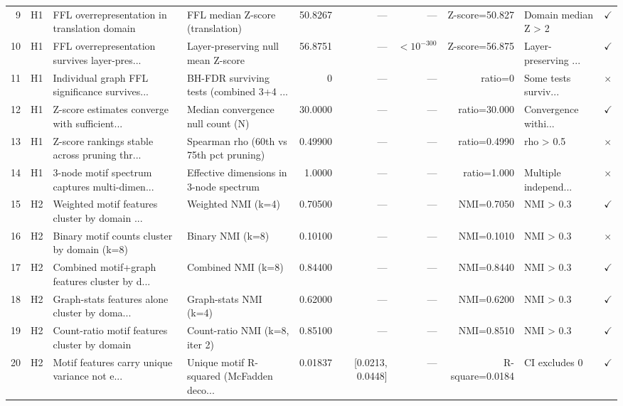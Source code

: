 \documentclass[11pt,a4paper]{article}
\begin{document}
\begin{landscape}
\begin{longtable}{rlp{3.2cm}p{3cm}rrrrp{1.5cm}l}
\rowcolor{rowgray}
9 & H1 & FFL overrepresentation in translation domain & FFL median Z-score (translation) & 50.8267 & --- & --- & Z-score=50.827 & Domain median Z \textgreater{} 2 & $\checkmark$ \\
10 & H1 & FFL overrepresentation survives layer-pres... & Layer-preserving null mean Z-score & 56.8751 & --- & $<10^{-300}$ & Z-score=56.875 & Layer-preserving ... & $\checkmark$ \\
\rowcolor{rowgray}
11 & H1 & Individual graph FFL significance survives... & BH-FDR surviving tests (combined 3+4 ... & 0 & --- & --- & ratio=0 & Some tests surviv... & $\times$ \\
12 & H1 & Z-score estimates converge with sufficient... & Median convergence null count (N) & 30.0000 & --- & --- & ratio=30.000 & Convergence withi... & $\checkmark$ \\
\rowcolor{rowgray}
13 & H1 & Z-score rankings stable across pruning thr... & Spearman rho (60th vs 75th pct pruning) & 0.49900 & --- & --- & ratio=0.4990 & rho \textgreater{} 0.5 & $\times$ \\
14 & H1 & 3-node motif spectrum captures multi-dimen... & Effective dimensions in 3-node spectrum & 1.0000 & --- & --- & ratio=1.000 & Multiple independ... & $\times$ \\
\midrule
\rowcolor{rowgray}
15 & H2 & Weighted motif features cluster by domain ... & Weighted NMI (k=4) & 0.70500 & --- & --- & NMI=0.7050 & NMI \textgreater{} 0.3 & $\checkmark$ \\
16 & H2 & Binary motif counts cluster by domain (k=8) & Binary NMI (k=8) & 0.10100 & --- & --- & NMI=0.1010 & NMI \textgreater{} 0.3 & $\times$ \\
\rowcolor{rowgray}
17 & H2 & Combined motif+graph features cluster by d... & Combined NMI (k=8) & 0.84400 & --- & --- & NMI=0.8440 & NMI \textgreater{} 0.3 & $\checkmark$ \\
18 & H2 & Graph-stats features alone cluster by doma... & Graph-stats NMI (k=4) & 0.62000 & --- & --- & NMI=0.6200 & NMI \textgreater{} 0.3 & $\checkmark$ \\
\rowcolor{rowgray}
19 & H2 & Count-ratio motif features cluster by domain & Count-ratio NMI (k=8, iter 2) & 0.85100 & --- & --- & NMI=0.8510 & NMI \textgreater{} 0.3 & $\checkmark$ \\
20 & H2 & Motif features carry unique variance not e... & Unique motif R-squared (McFadden deco... & 0.01837 & [0.0213, 0.0448] & --- & R-square=0.0184 & CI excludes 0 & $\checkmark$ \\

\end{longtable}
\end{landscape}
\end{document}
